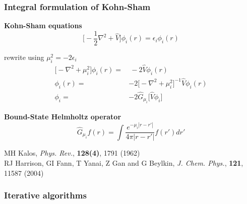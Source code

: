 \documentclass[mathserif, 10pt]{beamer}
\begin{document}
\begin{frame}
    \frametitle{Integral formulation of Kohn-Sham}
    \centering
    \textbf{Kohn-Sham equations}
    \begin{equation}
	\nonumber
	\bigg[-\frac{1}{2}\nabla^2 + \hat{V}\bigg]\phi_i(r) = \epsilon_i \phi_i(r)
    \end{equation}

    \vspace{5mm}

    rewrite using $\mu_i^2 = -2\epsilon_i$
    \begin{align}
	\nonumber
	\Big[-\nabla^2 + \mu_i^2\Big]\phi_i(r) =&\ -2\hat{V}\phi_i(r)\\
	\nonumber
	\phi_i(r) =&-2\Big[-\nabla^2 + \mu_i^2\Big]^{-1}\hat{V}\phi_i(r)\\
	\nonumber
	\phi_i =&-2\hat{G}_{\mu_i}\Big[\hat{V}\phi_i\Big]
    \end{align}

    \vspace{5mm}

    \textbf{Bound-State Helmholtz operator}
    \begin{equation}
	\nonumber
	\hat{G}_{\mu_i}f(r) = \int \frac{e^{-\mu_i |r-r'|}}{4\pi|r-r'|}f(r')dr'
    \end{equation}

    \vspace{5mm}

    \centering
    \tiny
    MH Kalos,
    {\it Phys. Rev.}, 
    \textbf{128(4)},
    1791 (1962)\\
    RJ Harrison, GI Fann, T Yanai, Z Gan and G Beylkin,
    {\it J. Chem. Phys.}, 
    \textbf{121},
    11587 (2004)
\end{frame}

\begin{frame}
    \frametitle{Iterative algorithms}
\end{frame}
\end{document}
